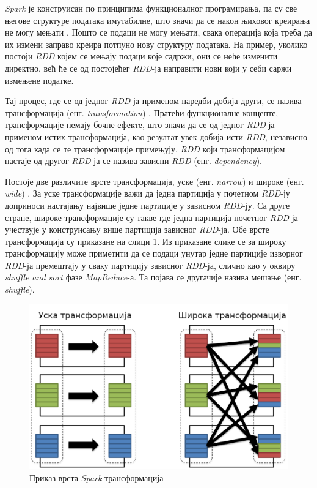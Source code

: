 \documentclass[12pt,oneside]{memoir}
\begin{document}
\textit{Spark} је конструисан по принципима функционалног програмирања, па су све његове структуре података имутабилне, што значи да се након њиховог креирања не могу мењати \cite{spark_guide}. Пошто се подаци не могу мењати, свака операција која треба да их измени заправо креира потпуно нову структуру података. На пример, уколико постоји \textit{RDD} којем се мењају подаци које садржи, они се неће изменити директно, већ ће се од постојећег \textit{RDD}-ја направити нови који у себи саржи измењене податке.

Тај процес, где се од једног \textit{RDD}-ја применом наредби добија други, се назива трансформација (енг. \textit{transformation})  \cite{spark_guide}. Пратећи функционалне концепте, трансформације немају бочне ефекте, што значи да се од једног \textit{RDD}-ја применом истих трансформација, као резултат увек добија исти \textit{RDD}, независно од тога када се те трансформације примењују. \textit{RDD} који трансформацијом настаје од другог \textit{RDD}-ја се назива зависни \textit{RDD} (енг. \textit{dependency}).

Постоје две различите врсте трансформација, уске (енг. \textit{narrow}) и широке (енг. \textit{wide}) \cite{spark_guide}. За уске трансформације важи да једна партиција у почетном \textit{RDD}-ју доприноси настајању највише једне партиције у зависном \textit{RDD}-ју. Са друге стране, широке трансформације су такве где једна партиција почетног \textit{RDD}-ја учествује у конструисању више партиција зависног \textit{RDD}-ја. Обе врсте трансформација су приказане на слици \ref{fig:sprk_trnsf}. Из приказане слике се за широку трансформацију може приметити да се подаци унутар једне партиције изворног \textit{RDD}-ја премештају у сваку партицију зависног \textit{RDD}-ја, слично као у оквиру \textit{shuffle and sort} фазе \textit{MapReduce}-а. Та појава се другачије назива мешање (енг. \textit{shuffle}).

\begin{figure}[!ht]
  \centering
  \includegraphics[width=1\textwidth]{pictures/spark_transformation_types.png}
  \caption{Приказ врста \textit{Spark} трансформација}
  \label{fig:sprk_trnsf}
\end{figure}
\end{document}
